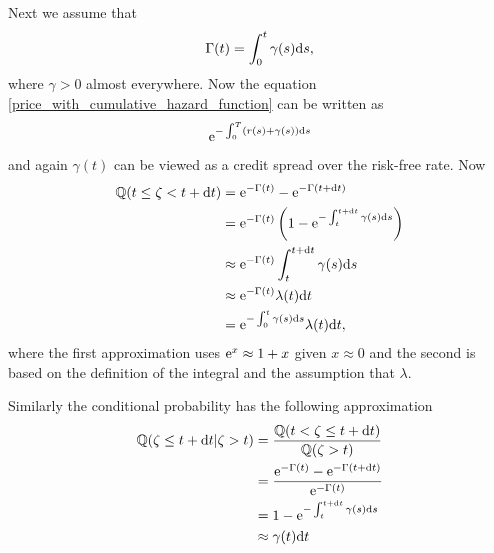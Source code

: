 Next we assume that
  \begin{align}
    \label{Gammaisgammaintegral}
    \Gamma(t) = \int_0^t \gamma (s) \mathrm{d} s,
  \end{align}
where $\gamma > 0$ almost everywhere. Now the equation \ref{price_with_cumulative_hazard_function} can be written as
  \begin{align}
    \mathrm{e}^{ - \int_0^T \left( r(s) + \gamma(s) \right) \mathrm{d} s }
  \end{align}
and again $\gamma(t)$ can be viewed as a credit spread over the risk-free rate. Now
  \begin{align}
    \mathbb{Q}( t \leq \zeta < t + \mathrm{d} t ) &= \mathrm{e}^{- \Gamma(t) } - \mathrm{e}^{- \Gamma(t + \mathrm{d} t) } \\
      &=\mathrm{e}^{- \Gamma(t) } \left( 1 - \mathrm{e}^{ - \int_t^{t + \mathrm{d} t} \gamma (s) \mathrm{d} s } \right) \\
      &\approx \mathrm{e}^{- \Gamma(t) } \int_t^{t + \mathrm{d} t} \gamma (s) \mathrm{d} s \\
      &\approx \mathrm{e}^{- \Gamma(t) } \lambda(t) \mathrm{d} t \\
      &= \mathrm{e}^{ - \int_0^t \gamma (s) \mathrm{d} s } \lambda(t) \mathrm{d} t ,
  \end{align}
where the first approximation uses $\mathrm{e}^x \approx 1 + x$ given $x \approx 0$ and the second is based on the definition of the integral and the assumption that $\lambda$.

Similarly the conditional probability has the following approximation
  \begin{align}
    \mathbb{Q} (\zeta \leq t + \mathrm{d} t | \zeta > t) &= \frac{ \mathbb{Q} (t < \zeta \leq t + \mathrm{d} t) }{ \mathbb{Q} (\zeta > t) } \\
      &= \frac{ \mathrm{e}^{- \Gamma(t) } - \mathrm{e}^{- \Gamma(t + \mathrm{d} t) } }{ \mathrm{e}^{- \Gamma(t) } } \\
      &= 1 - \mathrm{e}^{ - \int_t^{t + \mathrm{d} t} \gamma (s) \mathrm{d} s } \\
      &\approx \gamma(t) \mathrm{d} t
  \end{align}

